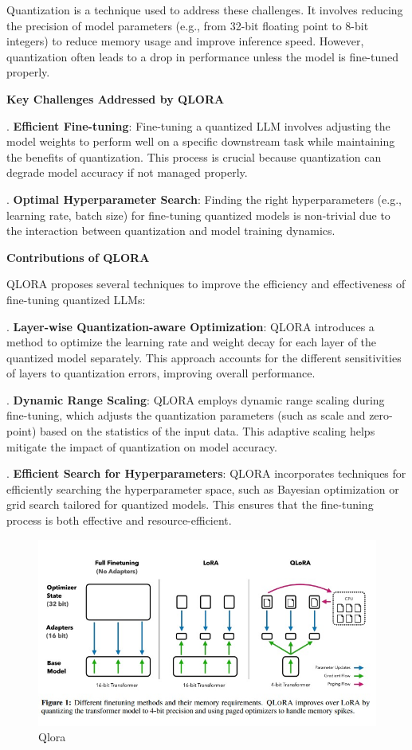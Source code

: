 \hfill \break
Quantization is a technique used to address these challenges. It involves reducing the precision of model parameters (e.g., from 32-bit floating point to 8-bit integers) to reduce memory usage and improve inference speed. However, quantization often leads to a drop in performance unless the model is fine-tuned properly.

\hfill \break
\textbf{Key Challenges Addressed by QLORA}

\hfill {}. \textbf{Efficient Fine-tuning}: Fine-tuning a quantized LLM involves adjusting the model weights to perform well on a specific downstream task while maintaining the benefits of quantization. This process is crucial because quantization can degrade model accuracy if not managed properly.

\hfill {}. \textbf{Optimal Hyperparameter Search}: Finding the right hyperparameters (e.g., learning rate, batch size) for fine-tuning quantized models is non-trivial due to the interaction between quantization and model training dynamics.

\hfill \break
\textbf{Contributions of QLORA}

QLORA proposes several techniques to improve the efficiency and effectiveness of fine-tuning quantized LLMs:


\hfill {}. \textbf{Layer-wise Quantization-aware Optimization}: QLORA introduces a method to optimize the learning rate and weight decay for each layer of the quantized model separately. This approach accounts for the different sensitivities of layers to quantization errors, improving overall performance.


\hfill {}. \textbf{Dynamic Range Scaling}: QLORA employs dynamic range scaling during fine-tuning, which adjusts the quantization parameters (such as scale and zero-point) based on the statistics of the input data. This adaptive scaling helps mitigate the impact of quantization on model accuracy.


\hfill {}. \textbf{Efficient Search for Hyperparameters}: QLORA incorporates techniques for efficiently searching the hyperparameter space, such as Bayesian optimization or grid search tailored for quantized models. This ensures that the fine-tuning process is both effective and resource-efficient.

\begin{figure}[h!]
	\centering
	\includegraphics[scale=0.5]{figures/Qlora.jpeg}
	\caption{ Qlora }
\end{figure}
\newpage
